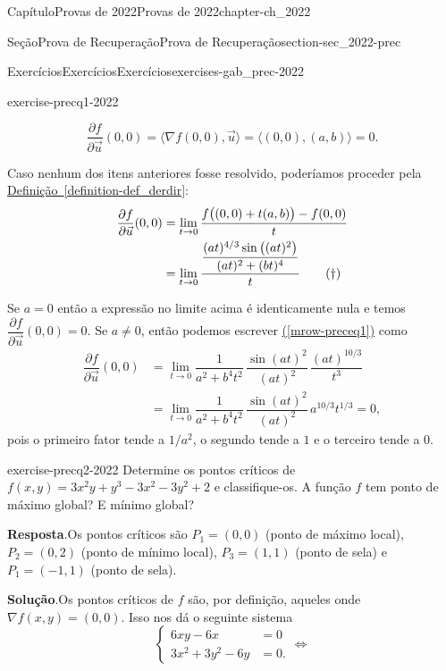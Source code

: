 \documentclass[oneside,10pt,]{book}
\newcommand{\blocktitlefont}{\relax}
\newcommand{\xreffont}{\relax}
\numberwithin{equation}{section}
\newcommand{\amp}{&}
\begin{document}
\begin{chapterptx}{Capítulo}{Provas de 2022}{}{Provas de 2022}{}{}{chapter-ch_2022}
\begin{sectionptx}{Seção}{Prova de Recuperação}{}{Prova de Recuperação}{}{}{section-sec_2022-prec}
\begin{exercises-subsection-numberless}{Exercícios}{Exercícios}{}{Exercícios}{}{}{exercises-gab_prec-2022}
\begin{divisionexercise}{1}{}{}{exercise-precq1-2022}
\begin{enumerate}[label=\alph*.]
\begin{equation*}
\dfrac{\partial
f}{\partial\vec{u}}(0,0)=\Big\langle\nabla
f(0,0),\vec{u}\Big\rangle=\big\langle(0,0),(a,b)\rangle=0.
\end{equation*}
%
\par
Caso nenhum dos itens anteriores fosse resolvido, poderíamos proceder pela \hyperref[definition-def_derdir]{Definição~{\xreffont\ref{definition-def_derdir}}}:%
\begin{align}
\dfrac{\partial
f}{\partial\vec{u}}(0,0)&=\lim\limits_{t\to
0}\dfrac{f\big((0,0)+t(a,b)\big)-f(0,0)}{t}\notag\\
&=\lim\limits_{t\to
0}\dfrac{\dfrac{(at)^{4/3}\sin\big((at)^2\big)}{(at)^2+(bt)^4}}{t}\tag{\textdagger}\label{mrow-preceq1}
\end{align}
%
\par
Se \(a=0\) então a expressão no limite acima é identicamente nula e temos \(\dfrac{\partial
f}{\partial\vec{u}}(0,0)=0\). Se \(a\neq 0\), então podemos escrever \hyperref[mrow-preceq1]{({\xreffont\ref{mrow-preceq1}})} como%
\begin{align*}
\dfrac{\partial
f}{\partial\vec{u}}(0,0)&=\lim\limits_{t\to
0}\dfrac{1}{a^2+b^4t^2}\,\dfrac{\sin(at)^2}{(at)^2}\,\dfrac{(at)^{10/3}}{t^3}\\
&=\lim\limits_{t\to
0}\dfrac{1}{a^2+b^4t^2}\,\dfrac{\sin(at)^2}{(at)^2}\,a^{10/3}t^{1/3}=0,
\end{align*}
pois o primeiro fator tende a \(1/a^2\), o segundo tende a \(1\) e o terceiro tende a \(0\).%
\end{enumerate}
%
\end{divisionexercise}%
\begin{divisionexercise}{2}{}{}{exercise-precq2-2022}%
Determine os pontos críticos de \(f(x,y)=
3x^2y+y^3-3x^2-3y^2+2\) e classifique-os. A função \(f\) tem ponto de máximo global? E mínimo global?%
\par\smallskip%
\noindent\textbf{\blocktitlefont Resposta}.\hypertarget{answer-precq2-2022-b}{}\quad{}Os pontos críticos são \(P_1=(0,0)\) (ponto de máximo local), \(P_2=(0,2)\) (ponto de mínimo local), \(P_3=(1,1)\) (ponto de sela) e \(P_1=(-1,1)\) (ponto de sela).%
\par\smallskip%
\noindent\textbf{\blocktitlefont Solução}.\hypertarget{solution-precq2-2022-c}{}\quad{}Os pontos críticos de \(f\) são, por definição, aqueles onde \(\nabla f(x,y)=(0,0)\). Isso nos dá o seguinte sistema%
\begin{equation*}
\begin{cases} 6xy-6x\amp=0\\ 3x^2+3y^2-6y\amp=0.  \end{cases}\iff

\end{equation*}
\end{divisionexercise}
\end{exercises-subsection-numberless}
\end{sectionptx}
\end{chapterptx}
\end{document}
